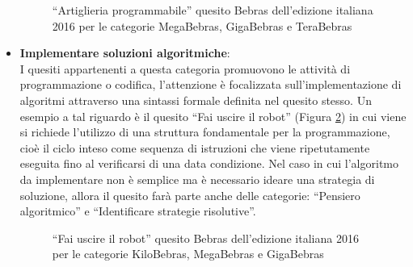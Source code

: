\documentclass[12pt]{report}
\begin{document}
\begin{itemize}
	\begin{figure}[h]
		\centering
		\caption{``Artiglieria programmabile'' quesito Bebras dell'edizione italiana 2016 per le categorie MegaBebras, GigaBebras e TeraBebras}\label{artiglieria_programmabile}
	\end{figure}
	
	
\bigskip
	\item \textbf{Implementare soluzioni algoritmiche}: 
	\\
	I quesiti appartenenti a questa categoria promuovono le attività di programmazione o codifica, l'attenzione è focalizzata sull'implementazione di algoritmi attraverso una sintassi formale definita nel quesito stesso. 
	Un esempio a tal riguardo è il quesito ``Fai uscire il robot'' (Figura \ref{robot}) in cui viene si richiede l'utilizzo di una struttura fondamentale per la programmazione, cioè il ciclo inteso come sequenza di istruzioni che viene ripetutamente eseguita fino al verificarsi di una data condizione.
	Nel caso in cui l'algoritmo da implementare non è semplice ma è necessario ideare una strategia di soluzione, allora il quesito farà parte anche delle categorie: ``Pensiero algoritmico'' e ``Identificare strategie risolutive''.
	
	\begin{figure}[h]
		\centering
		\caption{``Fai uscire il robot'' quesito Bebras dell'edizione italiana 2016 per le categorie KiloBebras, MegaBebras e GigaBebras}\label{robot}
	\end{figure}
	

\end{itemize}
\end{document}
